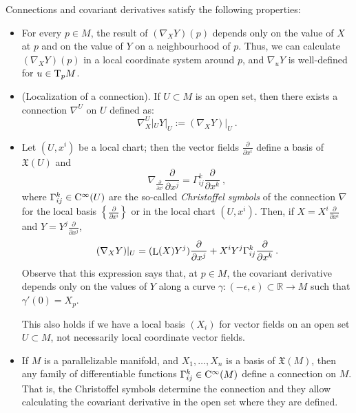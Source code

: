 \documentclass[12pt]{report}
\def\derpar#1#2{\frac{\partial{#1}}{\partial{#2}}}
\def\vf{\mathfrak X}
\def\Real{\mathbb{R}}
\def\Tan{{\rm T}}
\def\Lie{\mathop{\rm L}\nolimits}
\def\Cinfty{{\rm C}^\infty}
\begin{document}
Connections and covariant derivatives
satisfy the following properties:
\begin{itemize}
\item 
For every $p\in M$, the result of $(\nabla_X Y)(p)$ 
depends only on the value of $X$ at $p$ and 
on the value of $Y$  on a neighbourhood of $p$. 
Thus, we can calculate $(\nabla_X Y)(p)$ in a local coordinate system 
around $p$, and $\nabla_u Y$ is well-defined for $u\in\Tan_{p}M$. 
\item 
(Localization of a connection). 
 If $U\subset M$ is an open set, then there exists a connection $\nabla^{U}$ on $U$ defined as:  
$$
\nabla^{U}_X|_{U} Y|_{U}:=(\nabla_X Y)|_{U} \ .
$$
\item
Let $(U,x^i)$ be a local chart; then the vector fields 
$\displaystyle\derpar{}{x^i}$ define a basis of 
$\vf(U)$ and
$$
\nabla_{\frac{\partial}{\partial x^{i}}}\frac{\partial}{\partial x^{j}}=\Gamma_{ij}^{k}\frac{\partial}{\partial x^{k}}\ ,
$$
where $\Gamma_{ij}^{k}\in\Cinfty(U)$ are the so-called 
{\sl Christoffel symbols} of the connection $\nabla$ 
for the local basis $\left\{\displaystyle\derpar{}{x^i}\right\}$ or in the local chart $(U,x^i)$.
Then, if $\displaystyle X=X^{i}{\frac{\partial}{\partial x^{i}}}$ and 
$\displaystyle Y=Y^{j}{\frac{\partial}{\partial x^{j}}}$,
$$
(\nabla_X Y)|_{U}=(\Lie(X)Y^{j}){\frac{\partial}{\partial x^{j}}}+
X^{i}Y^{j}\Gamma_{ij}^{k}{\frac{\partial}{\partial x^{k}}}\,.
$$
Observe that this expression says that, at $p\in M$,
the covariant derivative depends only on the values of $Y$ along a curve 
$\gamma\colon(-\epsilon,\epsilon)\subset\Real\to M$ 
such that $\gamma'(0)=X_{p}$.

This also holds if we have a local basis 
$(X_i)$ for vector fields on an open set $U\subset M$, not necessarily local coordinate vector fields.
\item
If $M$ is a parallelizable manifold, and $X_{1},\ldots, X_{n}$ 
is a basis of $\vf(M)$, then any family of differentiable functions 
$\Gamma_{ij}^{k}\in\Cinfty(M)$ define a connection on $M$. 
That is, the Christoffel symbols determine the connection 
and they allow calculating the covariant derivative 
in the open set where they are defined.


\end{itemize}
\end{document}
